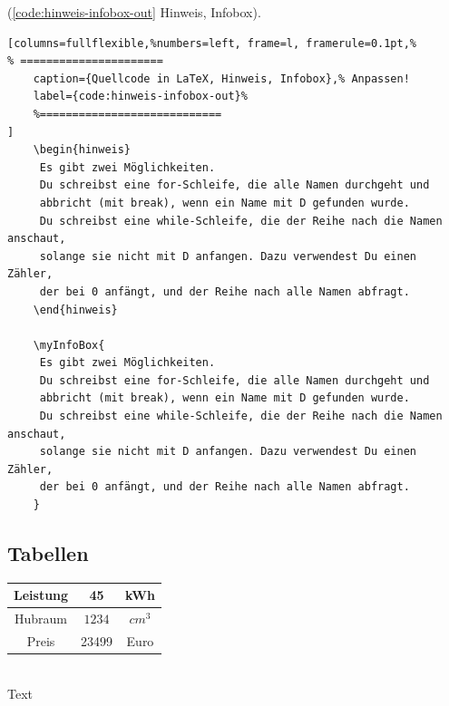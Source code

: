 
(\autoref{code:hinweis-infobox-out} Hinweis, Infobox).
\lstset{language=[LaTeX]TeX} %
\begin{lstlisting}[columns=fullflexible,%numbers=left, frame=l, framerule=0.1pt,%
% ======================
	caption={Quellcode in LaTeX, Hinweis, Infobox},% Anpassen!
	label={code:hinweis-infobox-out}%
	%============================
]
	\begin{hinweis}
	 Es gibt zwei Möglichkeiten.
	 Du schreibst eine for-Schleife, die alle Namen durchgeht und
	 abbricht (mit break), wenn ein Name mit D gefunden wurde.
	 Du schreibst eine while-Schleife, die der Reihe nach die Namen anschaut,
	 solange sie nicht mit D anfangen. Dazu verwendest Du einen Zähler,
	 der bei 0 anfängt, und der Reihe nach alle Namen abfragt.
	\end{hinweis}

	\myInfoBox{
	 Es gibt zwei Möglichkeiten.
	 Du schreibst eine for-Schleife, die alle Namen durchgeht und
	 abbricht (mit break), wenn ein Name mit D gefunden wurde.
	 Du schreibst eine while-Schleife, die der Reihe nach die Namen anschaut,
	 solange sie nicht mit D anfangen. Dazu verwendest Du einen Zähler,
	 der bei 0 anfängt, und der Reihe nach alle Namen abfragt.
	}
\end{lstlisting}

\newpage

\subsection{Tabellen}\label{sec:tabellen}

\begin{tabular}{ccc}
	\toprule
		Leistung & 45 & kWh \\
	\midrule
		Hubraum & $1234$ & $cm^3$ \\
		Preis & 23499 & Euro \\
	\bottomrule
\end{tabular}\\

Text

